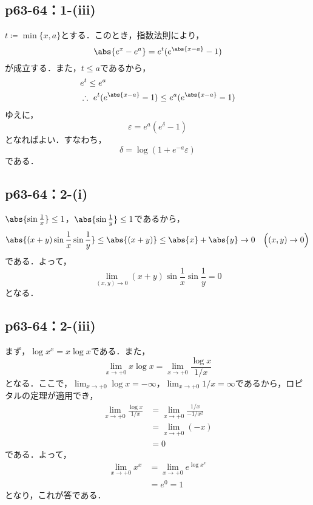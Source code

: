 \documentclass[uplatex,dvipdfmx,a4paper,10pt,fleqn]{jsarticle}
\begin{document}
\subsection*{p63-64：1-(iii)}


\begin{tleftbar}
    $t \coloneqq \min \{x,a\}$とする．このとき，指数法則により，
    \[
        \abs{e^x-e^a}=e^t (e^{\abs{x-a}}-1)
    \]
    が成立する．また，$t \le a$であるから，
    \begin{align*}
       & e^t \le e^a \\
        & \therefore ~ e^t(e^{\abs{x-a}}-1) \le e^a(e^{\abs{x-a}}-1)
    \end{align*}
    ゆえに，
    \[
        \varepsilon = e^a (e^\delta -1)
    \]
    となればよい．すなわち，
    \[
        \delta = \log (1+e^{-a}\varepsilon)
    \]
    である．
\end{tleftbar}

\subsection*{p63-64：2-(i)}

\begin{tleftbar}
    $\abs{\sin \frac{1}{x}} \le 1$，$\abs{\sin \frac{1}{y}} \le 1$であるから，
    \[
        \abs{(x+y) \sin \frac{1}{x} \sin \frac{1}{y}} \le \abs{(x+y)} \le \abs{x}+\abs{y} \to 0 \quad  \Bigl( (x,y) \to 0 \Bigl)
    \]
    である．よって，
    \[
        \lim_{(x,y)\to 0} (x+y) \sin \frac{1}{x} \sin \frac{1}{y} =0
    \]
    となる．
\end{tleftbar}

\subsection*{p63-64：2-(iii)}

\begin{tleftbar}
    まず，$\log x^x = x \log x$である．また，
    \[
        \lim_{x \to +0} x \log x  =\lim_{x \to +0} \frac{\log x}{1/x} 
    \]
    となる．ここで，$\lim_{x \to +0} \log x = -\infty$，$\lim_{x \to +0} 1/x =\infty$であるから，ロピタルの定理が適用でき，
    \begin{align*}
        \lim_{x \to +0} \frac{\log x}{1/x} & = \lim_{x \to +0} \frac{1/x}{-1/x^2} \\
        & = \lim_{x \to +0} (-x) \\
        & =0
    \end{align*}
    である．よって，
    \begin{align*}
    \lim_{x \to +0} x^x &= \lim_{x \to +0} e^{\log x^x} \\
    & =e^0 =1
    \end{align*}
    となり，これが答である．
\end{tleftbar}
\end{document}
